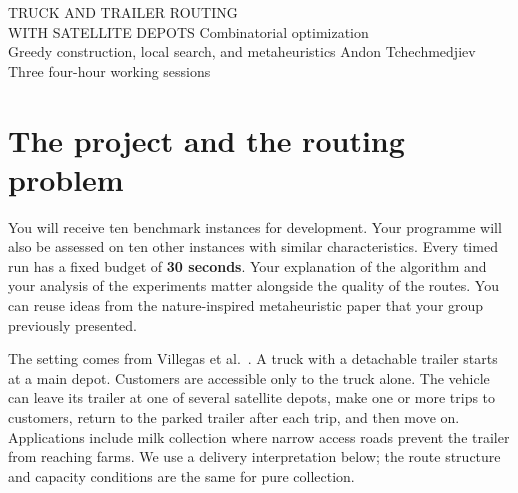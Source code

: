 \documentclass[11pt,a4paper]{article}
\begin{document}
{TRUCK AND TRAILER ROUTING\\WITH SATELLITE DEPOTS}
{Combinatorial optimization\\Greedy construction, local search, and metaheuristics}
{Andon Tchechmedjiev\\Three four-hour working sessions}
\section{The project and the routing problem}

You will receive ten benchmark instances for development. Your programme will also be assessed on ten other instances with similar characteristics. Every timed run has a fixed budget of \textbf{30 seconds}. Your explanation of the algorithm and your analysis of the experiments matter alongside the quality of the routes. You can reuse ideas from the nature-inspired metaheuristic paper that your group previously presented.

The setting comes from Villegas et al.~\cite{villegas}. A truck with a detachable trailer starts at a main depot. Customers are accessible only to the truck alone. The vehicle can leave its trailer at one of several satellite depots, make one or more trips to customers, return to the parked trailer after each trip, and then move on. Applications include milk collection where narrow access roads prevent the trailer from reaching farms. We use a delivery interpretation below; the route structure and capacity conditions are the same for pure collection.
\end{document}
